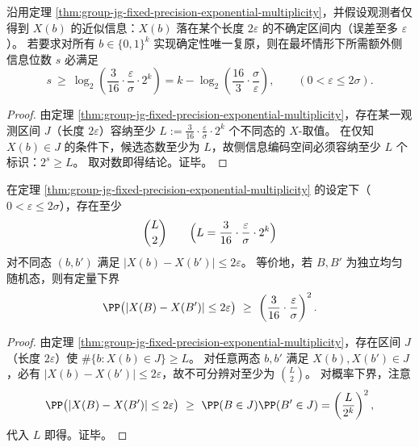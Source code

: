 \begin{corollary}[侧信息位数的不可避免下界]\label{cor:group-jg-side-information-bit-lower-bound}
沿用定理 \ref{thm:group-jg-fixed-precision-exponential-multiplicity}，并假设观测者仅得到 \(X(b)\) 的近似信息：\(X(b)\) 落在某个长度 \(2\varepsilon\) 的不确定区间内（误差至多 \(\varepsilon\)）。
若要求对所有 \(b\in\{0,1\}^k\) 实现确定性唯一复原，则在最坏情形下所需额外侧信息位数 \(s\) 必满足
\[
s\ \ge\ \log_2\!\left(\frac{3}{16}\cdot\frac{\varepsilon}{\sigma}\cdot2^k\right)
=k-\log_2\!\left(\frac{16}{3}\cdot\frac{\sigma}{\varepsilon}\right),
\qquad (0<\varepsilon\le 2\sigma).
\]
\end{corollary}
\begin{proof}
由定理 \ref{thm:group-jg-fixed-precision-exponential-multiplicity}，存在某一观测区间 \(J\)（长度 \(2\varepsilon\)）容纳至少
\(
L:=\frac{3}{16}\cdot\frac{\varepsilon}{\sigma}\cdot2^k
\)
个不同态的 \(X\)-取值。
在仅知 \(X(b)\in J\) 的条件下，候选态数至少为 \(L\)，故侧信息编码空间必须容纳至少 \(L\) 个标识：\(2^s\ge L\)。
取对数即得结论。证毕。
\end{proof}

\begin{proposition}[不可分辨对的指数级丰富性与碰撞概率下界]\label{prop:group-jg-indistinguishable-pairs-and-collision-probability}
在定理 \ref{thm:group-jg-fixed-precision-exponential-multiplicity} 的设定下（\(0<\varepsilon\le 2\sigma\)），存在至少
\[
\binom{L}{2}
\qquad\Bigl(L=\frac{3}{16}\cdot\frac{\varepsilon}{\sigma}\cdot2^k\Bigr)
\]
对不同态 \((b,b')\) 满足 \(|X(b)-X(b')|\le 2\varepsilon\)。
等价地，若 \(B,B'\) 为独立均匀随机态，则有定量下界
\[
\PP\bigl(|X(B)-X(B')|\le 2\varepsilon\bigr)\ \ge\ \left(\frac{3}{16}\cdot\frac{\varepsilon}{\sigma}\right)^2.
\]
\end{proposition}
\begin{proof}
由定理 \ref{thm:group-jg-fixed-precision-exponential-multiplicity}，存在区间 \(J\)（长度 \(2\varepsilon\)）使 \(\#\{b:X(b)\in J\}\ge L\)。
对任意两态 \(b,b'\) 满足 \(X(b),X(b')\in J\)，必有 \(|X(b)-X(b')|\le 2\varepsilon\)，故不可分辨对至少为 \(\binom{L}{2}\)。
对概率下界，注意
\[
\PP\bigl(|X(B)-X(B')|\le 2\varepsilon\bigr)\ \ge\ \PP(B\in J)\PP(B'\in J)=\left(\frac{L}{2^k}\right)^2,
\]
代入 \(L\) 即得。证毕。
\end{proof}

\endinput
